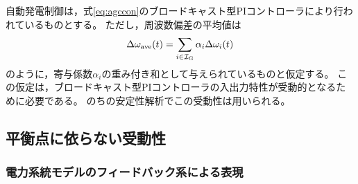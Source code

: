 \documentclass[tombow,dvipdfmx]{corona-a5}
\begin{document}
自動発電制御は，式\ref{eq:agccon}のブロードキャスト型PIコントローラにより行われているものとする。
ただし，周波数偏差の平均値は
\begin{align*}
\Delta \omega_{\rm ave}(t) =  
\sum_{i \in \mathcal{I}_{\rm G} }\alpha_i \Delta \omega_{i}(t)
\end{align*}
のように，寄与係数$\alpha_i$の重み付き和として与えられているものと仮定する。
この仮定は，ブロードキャスト型PIコントローラの入出力特性が受動的となるために必要である。
のちの安定性解析でこの受動性は用いられる。



\subsection{平衡点に依らない受動性\advanced}


\subsubsection{電力系統モデルのフィードバック系による表現}
\end{document}
